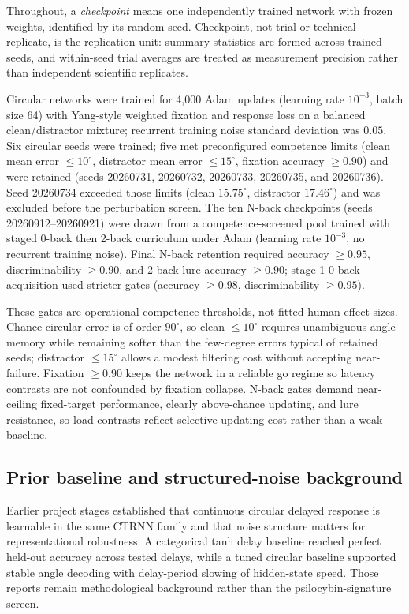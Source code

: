 Throughout, a \emph{checkpoint} means one independently trained network with
frozen weights, identified by its random seed. Checkpoint, not trial or
technical replicate, is the replication unit: summary statistics are formed
across trained seeds, and within-seed trial averages are treated as
measurement precision rather than independent scientific replicates.

Circular networks were trained for 4,000 Adam updates (learning rate
$10^{-3}$, batch size 64) with Yang-style weighted fixation and response loss
on a balanced clean/distractor mixture; recurrent training noise standard
deviation was $0.05$. Six circular seeds were trained; five met preconfigured
competence limits (clean mean error $\le10^\circ$, distractor mean error
$\le15^\circ$, fixation accuracy $\ge0.90$) and were retained (seeds 20260731,
20260732, 20260733, 20260735, and 20260736). Seed 20260734 exceeded those
limits (clean $15.75^\circ$, distractor $17.46^\circ$) and was excluded before
the perturbation screen. The ten N-back checkpoints
(seeds 20260912--20260921) were drawn from a competence-screened pool trained
with staged 0-back then 2-back curriculum under Adam (learning rate $10^{-3}$,
no recurrent training noise). Final N-back retention required accuracy
$\ge0.95$, discriminability $\ge0.90$, and 2-back lure accuracy $\ge0.90$;
stage-1 0-back acquisition used stricter gates (accuracy $\ge0.98$,
discriminability $\ge0.95$).

These gates are operational competence thresholds, not fitted human effect
sizes. Chance circular error is of order $90^\circ$, so clean $\le10^\circ$
requires unambiguous angle memory while remaining softer than the few-degree
errors typical of retained seeds; distractor $\le15^\circ$ allows a modest
filtering cost without accepting near-failure. Fixation $\ge0.90$ keeps the
network in a reliable go regime so latency contrasts are not confounded by
fixation collapse. N-back gates demand near-ceiling fixed-target performance,
clearly above-chance updating, and lure resistance, so load contrasts reflect
selective updating cost rather than a weak baseline.

\subsection{Prior baseline and structured-noise background}

Earlier project stages established that continuous circular delayed response is
learnable in the same CTRNN family and that noise structure matters for
representational robustness. A categorical tanh delay baseline reached perfect
held-out accuracy across tested delays, while a tuned circular baseline
supported stable angle decoding with delay-period slowing of hidden-state
speed. Those reports remain methodological background rather than the
psilocybin-signature screen.

